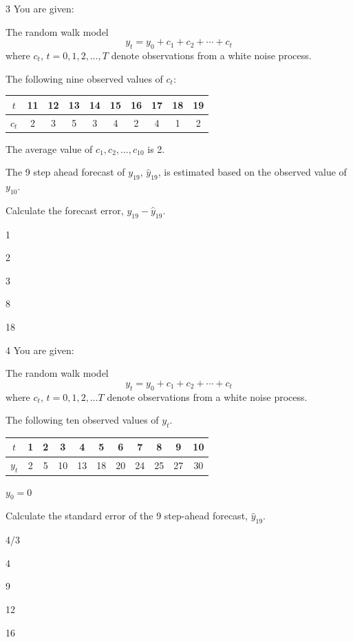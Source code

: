 \begin{question}{3}
You are given:
\begin{given}
\item The random walk model
\[ y_t = y_0 + c_1 + c_2 + \cdots + c_t \]
where $c_t,\, t = 0,1,2,\ldots,T$ denote observations from a white noise process.
\item The following nine observed values of $c_t$:
\begin{center}
\begin{tabular}{|c|c|c|c|c|c|c|c|c|c|}
\hline
$t$   & 11 & 12 & 13 & 14 & 15 & 16 & 17 & 18 & 19 \\ \hline
$c_t$ & 2  & 3  & 5  & 3  & 4  & 2  & 4  & 1  & 2  \\ \hline
\end{tabular}
\end{center}
\item The average value of $c_1, c_2, \ldots, c_{10}$ is 2.
\item The 9 step ahead forecast of $y_{19}$, $\hat{y}_{19}$, is estimated based on the observed value of $y_{10}$.
\end{given}

Calculate the forecast error, $y_{19} - \hat{y}_{19}$.

\begin{choices}
\item 1
\item 2
\item 3
\item 8
\item 18
\end{choices}
\end{question}

\begin{question}{4}
You are given:
\begin{given}
\item The random walk model
\[ y_t = y_0 + c_1 + c_2 + \cdots + c_t \]
where $c_t,\, t = 0,1,2,\ldots T$ denote observations from a white noise process.
\item The following ten observed values of $y_t$.
\begin{center}
\begin{tabular}{|c|c|c|c|c|c|c|c|c|c|c|}
\hline
$t$   & 1 & 2 & 3  & 4  & 5  & 6  & 7  & 8  & 9  & 10 \\ \hline
$y_t$ & 2 & 5 & 10 & 13 & 18 & 20 & 24 & 25 & 27 & 30 \\ \hline
\end{tabular}
\end{center}
\item $y_0 = 0$
\end{given}

Calculate the standard error of the 9 step-ahead forecast, $\hat{y}_{19}$.

\begin{choices}
\item 4/3
\item 4
\item 9
\item 12
\item 16
\end{choices}
\end{question}

